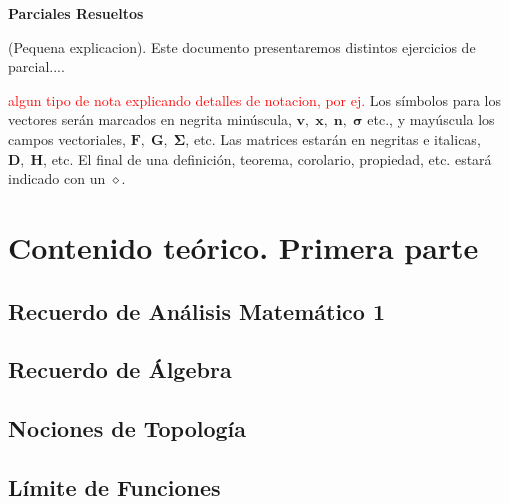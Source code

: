 \documentclass[10pt, a4paper]{report}
\begin{document}
    \newpage

    \setcounter{page}{1}
    \begin{center}
        \textbf{ \noindent \textbf{Parciales Resueltos}}
    \end{center}
    \vspace{3cm}
      
    (Pequena explicacion).  Este documento presentaremos distintos ejercicios de parcial....
    \newpage

    \tableofcontents
        \setcounter{page}{1}
    \vfill
    \textcolor{red}{algun tipo de nota explicando detalles de notacion, por ej.} Los símbolos para los vectores serán marcados en negrita minúscula, $\mathbf{v},\;\mathbf{x},\;\mathbf{n},\;\boldsymbol{\sigma}$ etc., y mayúscula los campos vectoriales, $\mathbf{F},\;\mathbf{G},\;\boldsymbol{\Sigma}$, etc. Las matrices estarán en negritas e italicas, $\boldsymbol{D},\;\boldsymbol{H}$, etc. El final de una definición, teorema, corolario, propiedad, etc. estará indicado con un $\diamond$.

    \chapter{Contenido teórico. Primera parte}
        \section{Recuerdo de Análisis Matemático 1}
            
        \section{Recuerdo de Álgebra}
            
        \section{Nociones de Topolog\'ia}
            
        \section{L\'imite de Funciones}
            
\end{document}
